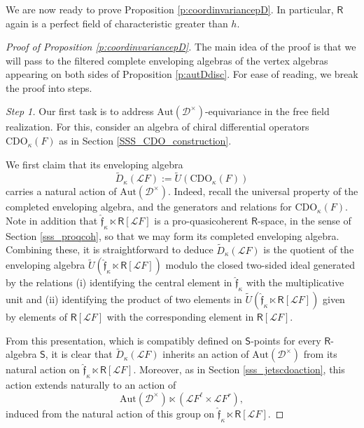 \documentclass{amsart}
\theoremstyle{definition}
\newcommand{\sss}{\subsubsection{}}
\newcommand{\fr}{^\on{(1)}}
\newcommand{\sD}{\mathscr{D}}
\newcommand{\Sing}{\mathsf{S}}
\newcommand{\on}{\mathrm}
\newcommand{\Ring}{\mathsf{R}}
\newcommand{\Loop}{\mathscr{L}}
\newcommand{\ff}{\mathfrak{f}}
\newcommand{\CDO}{\mathrm{CDO}}
\newcommand{\pD}{\sD^\times}
\newcommand{\ckappa}{\check{\kappa}}
\newcommand{\Op}{\on{Op}}
\newcommand{\Aut}{\on{Aut}}
\numberwithin{equation}{section}
\begin{document}
\sss{} We are now ready to prove Proposition \ref{p:coordinvariancepD}. In particular, $\Ring$ again is a perfect field of characteristic greater than $h$. 



\begin{proof}[Proof of Proposition \ref{p:coordinvariancepD}] The main idea of the proof is that we will pass to the filtered complete enveloping algebras of the vertex algebras appearing on both sides of Proposition \ref{p:autDdisc}. For ease of reading, we break the proof into steps. 








{\em Step 1.} Our first task is to address $\Aut(\pD)$-equivariance in the free field realization. For this, consider an algebra of chiral differential operators $\CDO_\kappa(F)$ as in Section \ref{SSS_CDO_construction}. 

We first claim that its enveloping algebra $$\widetilde{D}_\kappa(\Loop F) := \widetilde{U}(\CDO_\kappa(F))$$carries a natural action of $\Aut(\pD)$. Indeed, recall the universal property of the completed enveloping algebra, and the generators and relations for $\CDO_\kappa(F)$. Note in addition that $\hat{\ff}_\kappa \ltimes \Ring[\Loop F]$ is a pro-quasicoherent $\Ring$-space, in the sense of Section \ref{sss_proqcoh}, so that we may form its completed enveloping algebra. Combining these, it is straightforward to deduce $\widetilde{D}_\kappa(\Loop F)$ is the quotient of the enveloping algebra $\widetilde{U}( \hat{\ff}_\kappa \ltimes \Ring[\Loop F] )$ modulo the closed two-sided ideal generated by the relations (i) identifying the central element in $\hat{\ff}_\kappa$ with the multiplicative unit and (ii) identifying the product of two elements in $\widetilde{U}(\hat{\ff}_\kappa \ltimes \Ring[\Loop F])$ given by elements of $\Ring[\Loop F]$ with the corresponding element in $\Ring[\Loop F]$. 

From this presentation, which is compatibly defined on $\Sing$-points for every $\Ring$-algebra $\Sing$, it is clear that $\widetilde{D}_\kappa(\Loop F)$ inherits an action of $\Aut(\pD)$ from its natural action on $\hat{\ff}_\kappa \ltimes \Ring[\Loop F]$. Moreover, as in Section \ref{sss_jetscdoaction}, this action extends naturally to an action of 
$$\Aut(\pD) \ltimes (\Loop F^\ell \times \Loop F^r),$$
induced from the natural action of this group on $\hat{\ff}_\kappa \ltimes \Ring[\Loop F].$




\end{proof}
\end{document}
